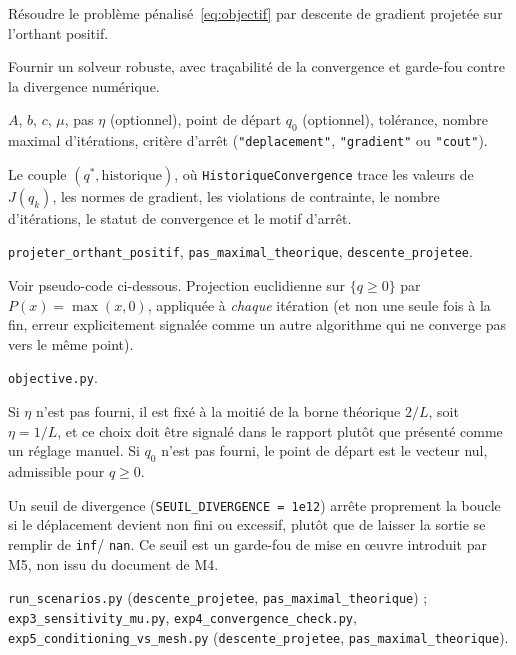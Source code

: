 \documentclass[11pt,a4paper]{article}
\begin{document}
\begin{description}[style=nextline]
  \item[Rôle] Résoudre le problème pénalisé~\eqref{eq:objectif} par descente
  de gradient projetée sur l'orthant positif.
  \item[Objectif] Fournir un solveur robuste, avec traçabilité de la
  convergence et garde-fou contre la divergence numérique.
  \item[Entrées] $A$, $b$, $c$, $\mu$, pas $\eta$ (optionnel), point de
  départ $q_0$ (optionnel), tolérance, nombre maximal d'itérations, critère
  d'arrêt (\texttt{"deplacement"}, \texttt{"gradient"} ou \texttt{"cout"}).
  \item[Sorties] Le couple $(q^*, \text{historique})$, où
  \texttt{HistoriqueConvergence} trace les valeurs de $J(q_k)$, les normes de
  gradient, les violations de contrainte, le nombre d'itérations, le
  statut de convergence et le motif d'arrêt.
  \item[Principales fonctions] \texttt{projeter\_orthant\_positif},
  \texttt{pas\_maximal\_theorique}, \texttt{descente\_projetee}.
  \item[Algorithmes] Voir pseudo-code ci-dessous. Projection euclidienne sur
  $\{q \geq 0\}$ par $P(x) = \max(x, 0)$, appliquée à \emph{chaque}
  itération (et non une seule fois à la fin, erreur explicitement signalée
  comme un autre algorithme qui ne converge pas vers le même point).
  \item[Dépendances] \texttt{objective.py}.
  \item[Hypothèses] Si $\eta$ n'est pas fourni, il est fixé à la moitié de la
  borne théorique $2/L$, soit $\eta = 1/L$, et ce choix doit être signalé
  dans le rapport plutôt que présenté comme un réglage manuel. Si $q_0$
  n'est pas fourni, le point de départ est le vecteur nul, admissible pour
  $q \geq 0$.
  \item[Contrôles] Un seuil de divergence (\texttt{SEUIL\_DIVERGENCE = 1e12})
  arrête proprement la boucle si le déplacement devient non fini ou
  excessif, plutôt que de laisser la sortie se remplir de \texttt{inf}/
  \texttt{nan}. Ce seuil est un garde-fou de mise en \oe uvre introduit par
  M5, non issu du document de M4.
  \item[Fichiers qui l'utilisent] \texttt{run\_scenarios.py}
  (\texttt{descente\_projetee}, \texttt{pas\_maximal\_theorique}) ;
  \texttt{exp3\_sensitivity\_mu.py}, \texttt{exp4\_convergence\_check.py},
  \texttt{exp5\_conditioning\_vs\_mesh.py} (\texttt{descente\_projetee},
  \texttt{pas\_maximal\_theorique}).
\end{description}
\end{document}
